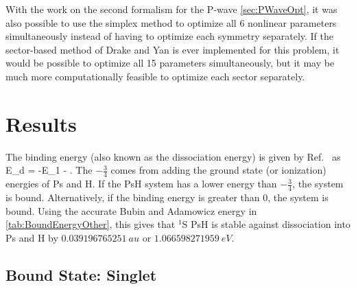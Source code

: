\documentclass[Dissertation.tex]{subfiles}
\begin{document}
With the work on the second formalism for the P-wave \cref{sec:PWaveOpt}, it was also possible to use the simplex method to optimize all 6 nonlinear parameters simultaneously instead of having to optimize each symmetry separately. If the sector-based method of Drake and Yan \cite{Yan1995} is ever implemented for this problem, it would be possible to optimize all 15 parameters simultaneously, but it may be much more computationally feasible to optimize each sector separately.


\section{Results}
\label{sec:BoundResults}

The binding energy (also known as the dissociation energy) is given by Ref.~\cite{Page1974} as
\beq
\label{eq:DissociationE}
E_d = -E_1 -  .
\eeq
The $-\frac{3}{4}$ comes from adding the ground state (or ionization) energies of Ps and H. If the PsH system has a lower energy than $-\frac{3}{4}$, the system is bound. 
Alternatively, if the binding energy is greater than 0, the system is bound.
Using the accurate Bubin and Adamowicz energy in \cref{tab:BoundEnergyOther}, this gives that $^1$S PsH is stable against dissociation into Ps and H by $\SI{0.039 196 765 251}{au}$ or $\SI{1.066 598 271 959}{eV}$. 

\subsection{Bound State: Singlet}
\label{sec:BoundSinglet}
\end{document}
